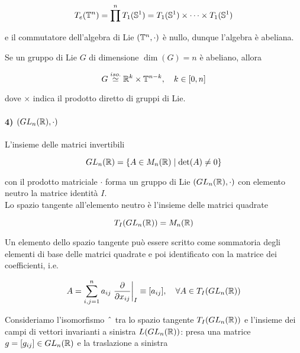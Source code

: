 \begin{equation}
	T_{e}(\mathbb{T}^{n}) = \prod^{n} T_{1}(\mathbb{S}^{1}) = T_{1}(\mathbb{S}^{1}) \times \cdots \times T_{1}(\mathbb{S}^{1})
\end{equation}

e il commutatore dell'algebra di Lie $ (\mathbb{T}^{n},\cdot) $ è nullo, dunque l'algebra è abeliana.

\begin{definition}
	Se un gruppo di Lie $ G $ di dimensione $ \dim(G) = n $ è abeliano, allora
	
	\begin{equation}
		G \stackrel{iso.}{\simeq} \R^{k} \times \T^{n-k} \qcomma k \in [0,n]
	\end{equation}

	dove $ \times $ indica il prodotto diretto di gruppi di Lie.
\end{definition}

\paragraph{4) $ (GL_{n}(\mathbb{R}),\cdot) $}

L'insieme delle matrici invertibili

\begin{equation}
	GL_{n}(\mathbb{R}) = \{ A \in M_{n}(\mathbb{R}) \mid \det(A) \neq 0 \}
\end{equation}

con il prodotto matriciale $ \cdot $ forma un gruppo di Lie $ (GL_{n}(\mathbb{R}),\cdot) $ con elemento neutro la matrice identità $ I $.\\
Lo spazio tangente all'elemento neutro è l'insieme delle matrici quadrate

\begin{equation}
	T_{I}(GL_{n}(\mathbb{R})) = M_{n}(\mathbb{R})
\end{equation}

Un elemento dello spazio tangente può essere scritto come sommatoria degli elementi di base delle matrici quadrate e poi identificato con la matrice dei coefficienti, i.e.

\begin{equation}
	A = \sum_{i,j=1}^{n} a_{ij} \eval{ \pdv{x_{ij}} }_{I} \equiv [a_{ij}] %
	\qcomma \forall A \in T_{I}(GL_{n}(\R))
\end{equation}

Consideriamo l'isomorfismo $ \; \hat{} \; $ tra lo spazio tangente $ T_{I}(GL_{n}(\mathbb{R})) $ e l'insieme dei campi di vettori invarianti a sinistra $ L(GL_{n}(\mathbb{R})) $: presa una matrice $ g = [g_{ij}] \in GL_{n}(\mathbb{R}) $ e la traslazione a sinistra

